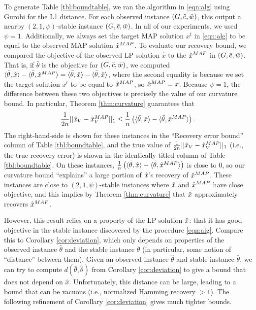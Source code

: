 To generate Table \ref{tbl:boundtable}, we ran the algorithm in \eqref{eqn:alg} using Gurobi \citep{gurobi} for the L1 distance. For each observed instance $(G,\hat{c},\hat{w})$, this output a nearby $(2,1,\psi)$-stable instance $(G,\bar{c},\bar{w})$. In all of our experiments, we used $\psi=1$. Additionally, we always set the target MAP solution $x^t$ in \eqref{eqn:alg} to be equal to the observed MAP solution $\hat{x}^{MAP}$. To evaluate our recovery bound, we compared the objective of the observed LP solution $\hat{x}$ to the $\hat{x}^{MAP}$ in $(G,\bar{c},\bar{w})$. That is, if $\bar{\theta}$ is the objective for $(G,\bar{c},\bar{w})$, we computed $\langle \bar{\theta},\hat{x}\rangle - \langle \bar{\theta},\hat{x}^{MAP}\rangle = \langle \bar{\theta},\hat{x}\rangle - \langle \bar{\theta},\bar{x}\rangle$, where the second equality is because we set the target solution $x^t$ to be equal to $\hat{x}^{MAP}$, so $\hat{x}^{MAP} = \bar{x}$. Because $\psi=1$, the difference between these two objectives is precisely the value of our curvature bound. In particular, Theorem \ref{thm:curvature} guarantees that \[
\frac{1}{2n}||\hat{x}_V - \hat{x}^{MAP}_V||_1 \le \frac{1}{n}\left(\langle \bar{\theta},\hat{x}\rangle - \langle \bar{\theta},\hat{x}^{MAP}\rangle\right).
\]
The right-hand-side is shown for these instances in the ``Recovery error bound'' column of Table \ref{tbl:boundtable}, and the true value of $\frac{1}{2n}||\hat{x}_V - \hat{x}^{MAP}_V||_1$ (i.e., the true recovery error) is shown in the identically titled column of Table \ref{tbl:boundtable}.
On these instances, $\frac{1}{n}\left(\langle \bar{\theta},\hat{x}\rangle - \langle \bar{\theta},\hat{x}^{MAP}\rangle\right)$ is close to 0, so our curvature bound ``explains'' a large portion of $\hat{x}$'s recovery of $\hat{x}^{MAP}$. These instances are close to $(2,1,\psi)$-stable instances where $\hat{x}$ and $\hat{x}^{MAP}$ have close objective, and this implies by Theorem \ref{thm:curvature} that $\hat{x}$ approximately recovers $\hat{x}^{MAP}$. 

However, this result relies on a property of the LP solution $\hat{x}$: that it has good objective in the stable instance discovered by the procedure \eqref{eqn:alg}. Compare this to Corollary \ref{cor:deviation}, which only depends on properties of the observed instance $\hat{\theta}$ and the stable instance $\bar{\theta}$ (in particular, some notion of ``distance'' between them). Given an observed instance $\hat{\theta}$ and stable instance $\bar{\theta}$, we can try to compute $d(\bar{\theta}, \hat{\theta})$ from Corollary \ref{cor:deviation} to give a bound that does not depend on $\hat{x}$. Unfortunately, this distance can be large, leading to a bound that can be vacuous (i.e., normalized Hamming recovery $> 1$). The following refinement of Corollary \ref{cor:deviation} gives much tighter bounds.

